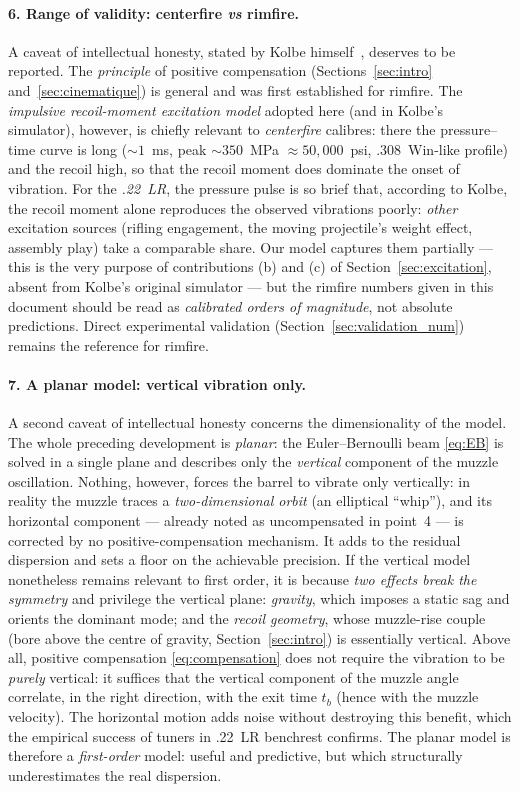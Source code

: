 \documentclass[12pt,a4paper]{article}
\begin{document}
	\paragraph{6. Range of validity: centerfire \emph{vs} rimfire.} A caveat of intellectual honesty, stated by Kolbe himself~\cite{KolbeSim}, deserves to be reported. The \emph{principle} of positive compensation (Sections~\ref{sec:intro} and~\ref{sec:cinematique}) is general and was first established for rimfire. The \emph{impulsive recoil-moment excitation model} adopted here (and in Kolbe's simulator), however, is chiefly relevant to \emph{centerfire} calibres: there the pressure--time curve is long ($\sim 1$~ms, peak $\sim 350$~MPa $\approx 50{,}000$~psi, .308~Win-like profile) and the recoil high, so that the recoil moment does dominate the onset of vibration. For the \emph{.22~LR}, the pressure pulse is so brief that, according to Kolbe, the recoil moment alone reproduces the observed vibrations poorly: \emph{other} excitation sources (rifling engagement, the moving projectile's weight effect, assembly play) take a comparable share. Our model captures them partially --- this is the very purpose of contributions (b) and (c) of Section~\ref{sec:excitation}, absent from Kolbe's original simulator --- but the rimfire numbers given in this document should be read as \emph{calibrated orders of magnitude}, not absolute predictions. Direct experimental validation (Section~\ref{sec:validation_num}) remains the reference for rimfire.

	\paragraph{7. A planar model: vertical vibration only.} A second caveat of intellectual honesty concerns the dimensionality of the model. The whole preceding development is \emph{planar}: the Euler--Bernoulli beam \eqref{eq:EB} is solved in a single plane and describes only the \emph{vertical} component of the muzzle oscillation. Nothing, however, forces the barrel to vibrate only vertically: in reality the muzzle traces a \emph{two-dimensional orbit} (an elliptical ``whip''), and its horizontal component --- already noted as uncompensated in point~4 --- is corrected by no positive-compensation mechanism. It adds to the residual dispersion and sets a floor on the achievable precision. If the vertical model nonetheless remains relevant to first order, it is because \emph{two effects break the symmetry} and privilege the vertical plane: \emph{gravity}, which imposes a static sag and orients the dominant mode; and the \emph{recoil geometry}, whose muzzle-rise couple (bore above the centre of gravity, Section~\ref{sec:intro}) is essentially vertical. Above all, positive compensation \eqref{eq:compensation} does not require the vibration to be \emph{purely} vertical: it suffices that the vertical component of the muzzle angle correlate, in the right direction, with the exit time $t_b$ (hence with the muzzle velocity). The horizontal motion adds noise without destroying this benefit, which the empirical success of tuners in .22~LR benchrest confirms. The planar model is therefore a \emph{first-order} model: useful and predictive, but which structurally underestimates the real dispersion.
\end{document}
